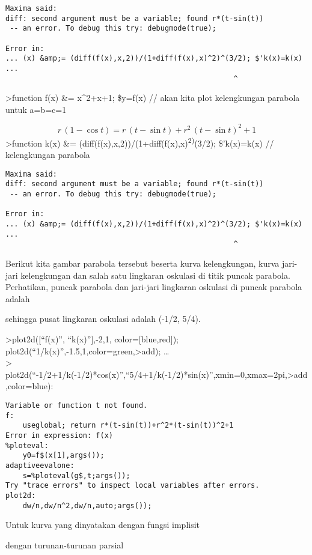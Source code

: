 \documentclass[
]{book}
\begin{document}
\begin{verbatim}
Maxima said:
diff: second argument must be a variable; found r*(t-sin(t))
 -- an error. To debug this try: debugmode(true);

Error in:
... (x) &amp;= (diff(f(x),x,2))/(1+diff(f(x),x)^2)^(3/2); $'k(x)=k(x)  ...
                                                     ^
\end{verbatim}

\textgreater function f(x) \&= x\^{}2+x+1; \$y=f(x) // akan kita plot kelengkungan parabola untuk a=b=c=1

\[r\,\left(1-\cos t\right)=r\,\left(t-\sin t\right)+r^2\,\left(t-\sin t\right)^2+1\]\textgreater function k(x) \&= (diff(f(x),x,2))/(1+diff(f(x),x)\textsuperscript{2)}(3/2); \$'k(x)=k(x) // kelengkungan parabola

\begin{verbatim}
Maxima said:
diff: second argument must be a variable; found r*(t-sin(t))
 -- an error. To debug this try: debugmode(true);

Error in:
... (x) &amp;= (diff(f(x),x,2))/(1+diff(f(x),x)^2)^(3/2); $'k(x)=k(x)  ...
                                                     ^
\end{verbatim}

Berikut kita gambar parabola tersebut beserta kurva kelengkungan, kurva jari-jari kelengkungan dan salah satu lingkaran oskulasi di titik puncak parabola. Perhatikan, puncak parabola dan jari-jari lingkaran oskulasi di puncak parabola adalah

sehingga pusat lingkaran oskulasi adalah (-1/2, 5/4).

\textgreater plot2d({[}``f(x)'', ``k(x)''{]},-2,1, color={[}blue,red{]}); plot2d(``1/k(x)'',-1.5,1,color=green,\textgreater add); \ldots{}\\
\textgreater{} plot2d(``-1/2+1/k(-1/2)*cos(x)'',``5/4+1/k(-1/2)*sin(x)'',xmin=0,xmax=2pi,\textgreater add,color=blue):

\begin{verbatim}
Variable or function t not found.
f:
    useglobal; return r*(t-sin(t))+r^2*(t-sin(t))^2+1 
Error in expression: f(x)
%ploteval:
    y0=f$(x[1],args());
adaptiveevalone:
    s=%ploteval(g$,t;args());
Try "trace errors" to inspect local variables after errors.
plot2d:
    dw/n,dw/n^2,dw/n,auto;args());
\end{verbatim}

Untuk kurva yang dinyatakan dengan fungsi implisit

dengan turunan-turunan parsial
\end{document}
